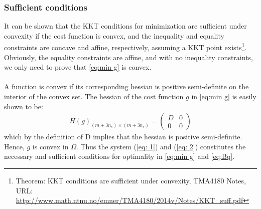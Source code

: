 \documentclass[10pt,a4paper]{article}
\begin{document}
\subsubsection{Sufficient conditions}
It can be shown that the KKT conditions for minimization are sufficient under convexity if the cost function is convex, and the inequality and equality constraints are concave and affine, respectively, assuming a KKT point exists\footnote{Theorem: KKT conditions are sufficient under convexity, TMA4180 Notes, URL: \url{http://www.math.ntnu.no/emner/TMA4180/2014v/Notes/KKT_suff.pdf}}. Obviously, the equality constraints are affine, and with no inequality constraints, we only need to prove that \eqref{eq:min g} is convex.
\\\\
A function is convex if its corresponding hessian is positive semi-definite on the interior of the convex set. The hessian of the cost function $g$ in \eqref{eq:min g} is easily shown to be:
\begin{align}
H(g)_{(m+3n_s) \times (m+3n_s)} = 
\begin{pmatrix}
D & 0 \\
0 & 0
\end{pmatrix}
\end{align}
which by the definition of D implies that the hessian is positive semi-definite.
Hence, $g$ is convex in $\Omega$. Thus the system (\ref{eq: 1}) and (\ref{eq: 2}) constitutes the necessary and sufficient conditions for optimality in \eqref{eq:min g} and \eqref{eq:Bq}.
\end{document}
